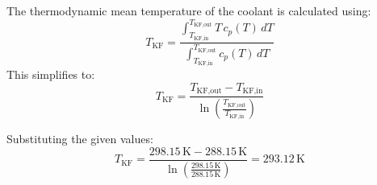The thermodynamic mean temperature of the coolant is calculated using:  
\[
T_{\text{KF}} = \frac{\int_{T_{\text{KF,in}}}^{T_{\text{KF,out}}} T \, c_p(T) \, dT}{\int_{T_{\text{KF,in}}}^{T_{\text{KF,out}}} c_p(T) \, dT}
\]  
This simplifies to:  
\[
T_{\text{KF}} = \frac{T_{\text{KF,out}} - T_{\text{KF,in}}}{\ln \left( \frac{T_{\text{KF,out}}}{T_{\text{KF,in}}} \right)}
\]  

Substituting the given values:  
\[
T_{\text{KF}} = \frac{298.15 \, \text{K} - 288.15 \, \text{K}}{\ln \left( \frac{298.15 \, \text{K}}{288.15 \, \text{K}} \right)} = 293.12 \, \text{K}
\]